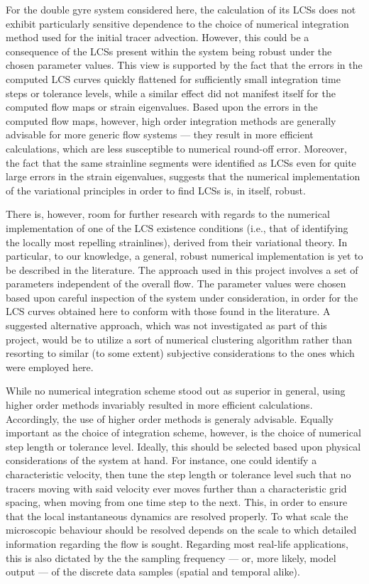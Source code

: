 For the double gyre system considered here, the calculation of its LCSs
does not exhibit particularly sensitive dependence to
the choice of numerical integration method used for the initial tracer
advection. However, this could be a consequence of the LCSs present within the
system being robust under the chosen parameter values. This view is supported by
the fact that the errors in the computed LCS curves quickly flattened for
sufficiently small integration time steps or tolerance levels, while a similar
effect did not manifest itself for the computed flow maps or strain eigenvalues.
Based upon the errors in the computed flow maps, however, high order integration
methods are generally advisable for more generic flow systems --- they result in
more efficient calculations, which are less susceptible to numerical round-off
error. Moreover, the fact that the same strainline segments were identified as
LCSs even for quite large errors in the strain eigenvalues, suggests that the
numerical implementation of the variational principles in order to find LCSs is,
in itself, robust.

There is, however, room for further research with regards to the numerical
implementation of one of the LCS existence conditions (i.e., that of identifying
the locally most repelling strainlines), derived from their variational theory.
In particular, to our knowledge, a general, robust numerical implementation is
yet to be described in the literature. The approach used in this project
involves a set of parameters independent of the overall flow. The parameter
values were chosen based upon careful inspection of the system under
consideration, in order for the LCS curves obtained here to conform with those
found in the literature. A suggested alternative approach, which was not
investigated as part of this project, would be to utilize a sort of numerical
clustering algorithm rather than resorting to similar (to some extent)
subjective considerations to the ones which were employed here.

While no numerical integration scheme stood out as superior in general,
using higher order methods invariably resulted in more efficient calculations.
Accordingly, the use of higher order methods is generaly advisable. Equally
important as the choice of integration scheme, however, is the choice of
numerical step length or tolerance level. Ideally, this should be selected based
upon physical considerations of the system at hand. For instance, one could
identify a characteristic velocity, then tune the step length or tolerance level
such that no tracers moving with said velocity ever moves further than a
characteristic grid spacing, when moving from one time step to the next. This,
in order to ensure that the local instantaneous dynamics are resolved properly.
To what scale the microscopic behaviour should be resolved depends on the scale
to which detailed information regarding the flow is sought. Regarding most
real-life applications, this is also dictated by the the sampling frequency ---
or, more likely, model output --- of the discrete data samples (spatial and
temporal alike).

